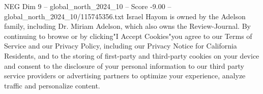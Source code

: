 \begin{textsample}{NEG Dim 9 – global\_north\_2024\_10 – Score -9.00 – global\_north\_2024\_10/115745356.txt}
Israel Hayom is owned by the Adelson family, including Dr.
Miriam Adelson, which also owns the Review-Journal.
By continuing to browse or by clicking"I Accept Cookies"you agree to our Terms of Service and our Privacy Policy, including our Privacy Notice for California Residents, and to the storing of first-party and third-party cookies on your device and consent to the disclosure of your personal information to our third party service providers or advertising partners to optimize your experience, analyze traffic and personalize content.

\end{textsample}
